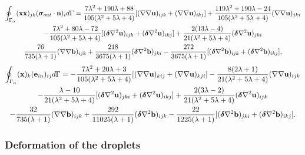 \begin{multline}
    \intS{(\textbf{xx})_{jk}(\bm\sigma_{out}\cdot \textbf{n})_i} 
    =
    \frac{7\lambda^2+190\lambda+88}{105(\lambda^2+5\lambda+4)}[
        (\grad\grad \textbf{u})_{ijk}
        + (\grad\grad \textbf{u})_{ikj}
    ]
    + \frac{119\lambda^2+190\lambda-24}{105(\lambda^2+5\lambda+4)}(\grad\grad \textbf{u})_{jki}\\
    - \frac{7\lambda^2+80\lambda-72}{105(\lambda^2+5\lambda+4)}[
        (\bm\delta \grad^2 \textbf{u})_{ijk}
        + (\bm\delta \grad^2 \textbf{u})_{ikj}
    ]
    + \frac{2(13\lambda-4)}{21(\lambda^2+5\lambda+4)}(\bm\delta\grad^2 \textbf{u})_{jki}\\
    \frac{76}{735(\lambda+1)}(\grad\grad \textbf{b})_{ijk}
    + \frac{218}{3675(\lambda+1)} (\bm\delta\grad^2\textbf{b})_{jki}
    - \frac{272}{3675(\lambda+1)} [(\bm\delta\grad^2\textbf{b})_{ijk}+(\bm\delta\grad^2\textbf{b})_{ikj}],
    \label{eq:second_order_closuresS}
\end{multline}
\begin{multline}
    \intS{(\textbf{x})_{k}(\textbf{e}_{in})_{ij}} 
    =
    - \frac{7\lambda^2+20\lambda+3}{105(\lambda^2+5\lambda+4)}[
        (\grad\grad \textbf{u})_{kij}
        + (\grad\grad \textbf{u})_{kji}
    ]
    - \frac{8(2\lambda+1)}{21(\lambda^2+5\lambda+4)}(\grad\grad \textbf{u})_{ijk}\\
    - \frac{\lambda-10}{21(\lambda^2+5\lambda+4)}[
        (\bm\delta \grad^2 \textbf{u})_{jki}
        + (\bm\delta \grad^2 \textbf{u})_{ikj}
    ]
    + \frac{2(3\lambda-2)}{21(\lambda^2+5\lambda+4)}(\bm\delta\grad^2 \textbf{u})_{ijk}\\
    - \frac{32}{735(\lambda+1)}(\grad\grad \textbf{b})_{ijk}
    + \frac{292}{11025(\lambda+1)} (\bm\delta\grad^2\textbf{b})_{ijk}
    - \frac{22}{1225(\lambda+1)} [(\bm\delta\grad^2\textbf{b})_{jki}+(\bm\delta\grad^2\textbf{b})_{ikj}].
    \label{eq:second_order_closuresE}
\end{multline}


\subsubsection*{Deformation of the droplets}


